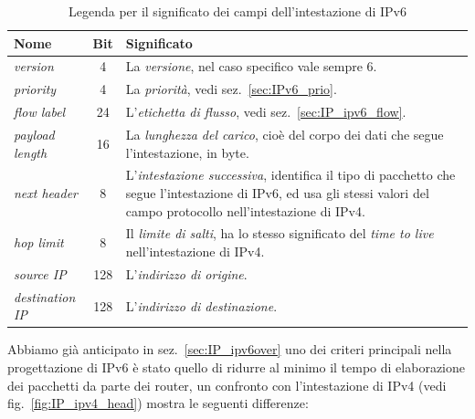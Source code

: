\begin{table}[htb]
  \begin{center}
  \footnotesize
    \begin{tabular}{|l|c|p{8cm}|}
      \hline
      \textbf{Nome} & \textbf{Bit} & \textbf{Significato} \\
      \hline
      \hline
      \textit{version}       & 4& La \textsl{versione}, nel caso specifico vale
                                  sempre 6.\\ 
      \textit{priority}      & 4& La \textsl{priorità}, vedi
                                  sez.~\ref{sec:IPv6_prio}.\\
      \textit{flow label}    &24& L'\textsl{etichetta di flusso}, vedi
                                  sez.~\ref{sec:IP_ipv6_flow}.\\ 
      \textit{payload length}&16& La \textsl{lunghezza del carico}, cioè del
                                  corpo dei dati che segue l'intestazione, in
                                  byte. \\ 
      \textit{next header}   & 8& L'\textsl{intestazione successiva}, 
                                  identifica il tipo di pacchetto che segue
                                  l'intestazione di IPv6, ed usa gli stessi
                                  valori del campo protocollo
                                  nell'intestazione di IPv4.\\ 
      \textit{hop limit}     & 8& Il \textsl{limite di salti}, ha lo stesso 
                                  significato del \textit{time to live} 
                                  nell'intestazione di IPv4.\\ 
      \textit{source IP}     &128&L'\textsl{indirizzo di origine}.\\
      \textit{destination IP}&128&L'\textsl{indirizzo di destinazione}.\\
      \hline
    \end{tabular}
    \caption{Legenda per il significato dei campi dell'intestazione di IPv6}
    \label{tab:IP_ipv6field}
  \end{center}
\end{table}

Abbiamo già anticipato in sez.~\ref{sec:IP_ipv6over} uno dei criteri
principali nella progettazione di IPv6 è stato quello di ridurre al minimo il
tempo di elaborazione dei pacchetti da parte dei router, un confronto con
l'intestazione di IPv4 (vedi fig.~\ref{fig:IP_ipv4_head}) mostra le seguenti
differenze:

